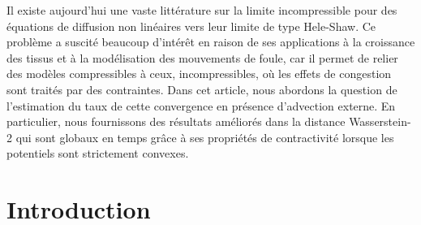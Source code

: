 \documentclass[JEP,XML,SOM,Unicode,published]{cedram}
\theoremstyle{plain}
\theoremstyle{remark}
\begin{document}




\begin{altabstract}
Il existe aujourd’hui une vaste littérature sur la limite incompressible pour des équations de diffusion non linéaires vers leur limite de type Hele-Shaw. Ce problème a suscité beaucoup d’intérêt en raison de ses applications à la croissance des tissus et à la modélisation des mouvements de foule, car il permet de relier des modèles compressibles à ceux, incompressibles, où les effets de congestion sont traités par des contraintes. Dans cet article, nous abordons la question de l’estimation du taux de cette convergence en présence d'advection externe. En particulier, nous fournissons des résultats améliorés dans la distance Wasserstein-2 qui sont globaux en temps grâce à ses propriétés de contractivité lorsque les potentiels sont strictement convexes.
\end{altabstract}

\maketitle
\vspace*{-\baselineskip}
\tableofcontents


\section{Introduction}
\end{document}
